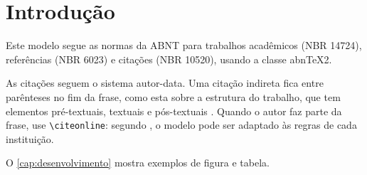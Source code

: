 \chapter{Introdução}
\label{cap:introducao}

Este modelo segue as normas da ABNT para trabalhos acadêmicos (NBR 14724), referências
(NBR 6023) e citações (NBR 10520), usando a classe abnTeX2.

As citações seguem o sistema autor-data. Uma citação indireta fica entre parênteses no
fim da frase, como esta sobre a estrutura do trabalho, que tem elementos pré-textuais,
textuais e pós-textuais \cite{abnt-nbr14724}. Quando o autor faz parte da frase, use
\verb|\citeonline|: segundo , o modelo pode ser adaptado às
regras de cada instituição.

O \autoref{cap:desenvolvimento} mostra exemplos de figura e tabela.
